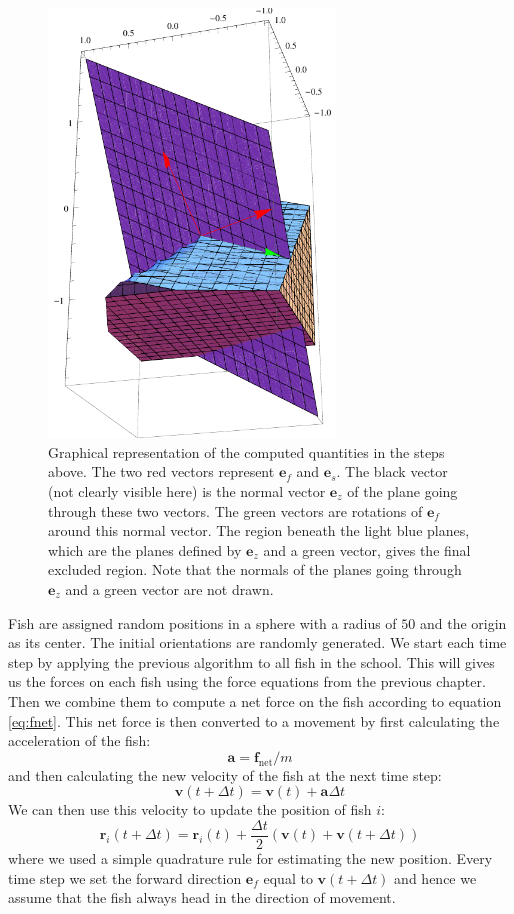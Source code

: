 \documentclass[11pt,a4paper]{article}
\begin{document}
\begin{figure}[H]
  \centering
  \includegraphics[width=3.0in]{geometry.pdf}
  \caption{Graphical representation of the computed quantities in the steps above. The two red vectors represent $\mathbf{e}_f$ and $\mathbf{e}_s$. The black vector (not clearly visible here) is the normal vector $\mathbf{e}_z$ of the plane going through these two vectors. The green vectors are rotations of $\mathbf{e}_f$ around this normal vector. The region beneath the light blue planes, which are the planes defined by $\mathbf{e}_z$ and a green vector, gives the final excluded region. Note that the normals of the planes going through $\mathbf{e}_z$ and a green vector are not drawn.}
  \label{fig:geometry}
\end{figure}
Fish are assigned random positions in a sphere with a radius of $50$ and the origin as its center. The initial orientations are randomly generated. We start each time step by applying the previous algorithm to all fish in the school. This will gives us the forces on each fish using the force equations from the previous chapter. Then we combine them to compute a net force on the fish according to equation \ref{eq:fnet}. This net force is then converted to a movement by first calculating the acceleration of the fish:
\begin{equation}
  \label{eq:acc}
  \mathbf{a} = \mathbf{f}_\text{net} / m
\end{equation}
and then calculating the new velocity of the fish at the next time step:
\begin{equation}
  \label{eq:vel}
  \mathbf{v}(t + \Delta t) = \mathbf{v}(t) + \mathbf{a} \Delta t
\end{equation}
We can then use this velocity to update the position of fish $i$:
\begin{equation}
  \label{eq:pos}
  \mathbf{r}_i(t + \Delta t) = \mathbf{r}_i(t) + \frac{\Delta t}{2}\left(\mathbf{v}(t) + \mathbf{v}(t + \Delta t)\right)
\end{equation}
where we used a simple quadrature rule for estimating the new position. Every time step we set the forward direction $\mathbf{e}_f$ equal to $\mathbf{v}(t + \Delta t)$ and hence we assume that the fish always head in the direction of movement.
\end{document}
